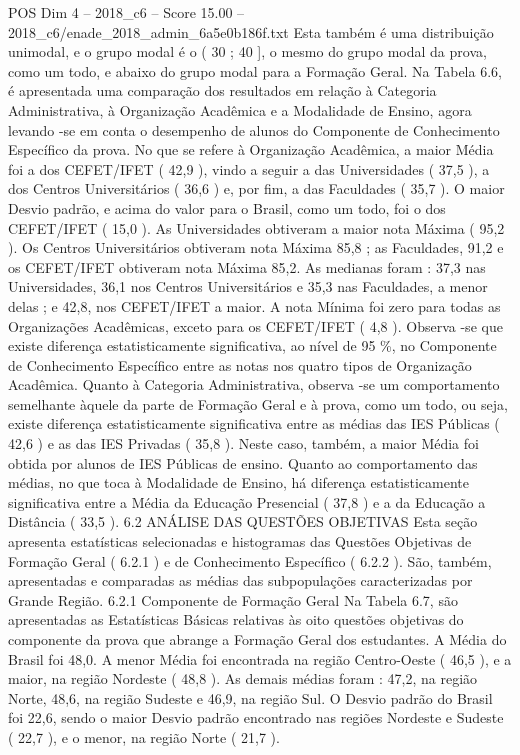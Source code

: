 \begin{textsample}{POS Dim 4 – 2018\_c6 – Score 15.00 – 2018\_c6/enade\_2018\_admin\_6a5e0b186f.txt}
Esta também é uma distribuição unimodal, e o grupo modal é o ( 30 ; 40 ], o mesmo do grupo modal da prova, como um todo, e abaixo do grupo modal para a Formação Geral.
Na Tabela 6.6, é apresentada uma comparação dos resultados em relação à Categoria Administrativa, à Organização Acadêmica e a Modalidade de Ensino, agora levando -se em conta o desempenho de alunos do Componente de Conhecimento Específico da prova.
No que se refere à Organização Acadêmica, a maior Média foi a dos CEFET/IFET ( 42,9 ), vindo a seguir a das Universidades ( 37,5 ), a dos Centros Universitários ( 36,6 ) e, por fim, a das Faculdades ( 35,7 ).
O maior Desvio padrão, e acima do valor para o Brasil, como um todo, foi o dos CEFET/IFET ( 15,0 ).
As Universidades obtiveram a maior nota Máxima ( 95,2 ).
Os Centros Universitários obtiveram nota Máxima 85,8 ; as Faculdades, 91,2 e os CEFET/IFET obtiveram nota Máxima 85,2.
As medianas foram : 37,3 nas Universidades, 36,1 nos Centros Universitários e 35,3 nas Faculdades, a menor delas ; e 42,8, nos CEFET/IFET a maior.
A nota Mínima foi zero para todas as Organizações Acadêmicas, exceto para os CEFET/IFET ( 4,8 ).
Observa -se que existe diferença estatisticamente significativa, ao nível de 95 \%, no Componente de Conhecimento Específico entre as notas nos quatro tipos de Organização Acadêmica.
Quanto à Categoria Administrativa, observa -se um comportamento semelhante àquele da parte de Formação Geral e à prova, como um todo, ou seja, existe diferença estatisticamente significativa entre as médias das IES Públicas ( 42,6 ) e as das IES Privadas ( 35,8 ).
Neste caso, também, a maior Média foi obtida por alunos de IES Públicas de ensino.
Quanto ao comportamento das médias, no que toca à Modalidade de Ensino, há diferença estatisticamente significativa entre a Média da Educação Presencial ( 37,8 ) e a da Educação a Distância ( 33,5 ). 6.2 ANÁLISE DAS QUESTÕES OBJETIVAS Esta seção apresenta estatísticas selecionadas e histogramas das Questões Objetivas de Formação Geral ( 6.2.1 ) e de Conhecimento Específico ( 6.2.2 ).
São, também, apresentadas e comparadas as médias das subpopulações caracterizadas por Grande Região. 6.2.1 Componente de Formação Geral Na Tabela 6.7, são apresentadas as Estatísticas Básicas relativas às oito questões objetivas do componente da prova que abrange a Formação Geral dos estudantes.
A Média do Brasil foi 48,0.
A menor Média foi encontrada na região Centro-Oeste ( 46,5 ), e a maior, na região Nordeste ( 48,8 ).
As demais médias foram : 47,2, na região Norte, 48,6, na região Sudeste e 46,9, na região Sul.
O Desvio padrão do Brasil foi 22,6, sendo o maior Desvio padrão encontrado nas regiões Nordeste e Sudeste ( 22,7 ), e o menor, na região Norte ( 21,7 ).

\end{textsample}
